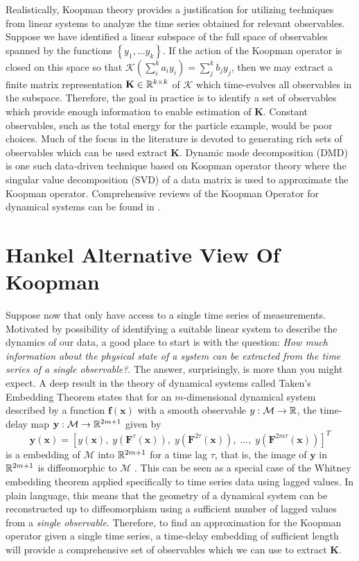 Realistically, Koopman theory provides a justification for utilizing techniques
from linear systems to analyze the time series obtained for relevant
observables. Suppose we have identified a linear subspace of the full space of
observables spanned by the functions $\left\{ y_1, ... y_k  \right\}$. If the
action of the Koopman operator is closed on this space so that
$\mathcal{K}(\sum_i^k a_i y_i) = \sum_j^k b_jy_j$, then we may extract a finite
matrix representation $\mathbf{K} \in \mathbb{R}^{k \times k}$ of $\mathcal{K}$ which
time-evolves all observables in the subspace. Therefore, the goal in practice is
to identify a set of observables which provide enough information to enable
estimation of $\mathbf{K}$. Constant observables, such as the total energy for
the particle example, would be poor choices. Much of the focus in the literature is
devoted to generating rich sets of observables which can be used extract
$\mathbf{K}$. Dynamic mode decomposition (DMD) is one such data-driven technique
based on Koopman operator theory where the singular value decomposition (SVD) of
a data matrix is used to approximate the Koopman operator. Comprehensive reviews
of the Koopman Operator for dynamical systems can be found in
\cite{brunton-koopman-theory, mezic-koopman-overview}.

\section{Hankel Alternative View Of Koopman}

Suppose now that only have access to a single time series of measurements.
Motivated by possibility of identifying a suitable linear system to describe the
dynamics of our data, a good place to start is with the question: \textit{How
  much information about the physical state of a system can be extracted from
  the time series of a single observable?}. The answer, surprisingly, is more
than you might expect. A deep result in the theory of dynamical systems called
Taken's Embedding Theorem states that for an $m$-dimensional dynamical system
described by a function $\mathbf{f}(\mathbf{x})$ with a smooth observable
$y:\mathcal{M}\to\mathbb{R}$, the time-delay map $\mathbf{y}:\mathcal{M}\to\mathbb{R}^{2m+1}$
given by
\begin{equation}
  \mathbf{y}(\mathbf{x}) = [y(\mathbf{x}),\; y(\mathbf{F}^{\tau}(\mathbf{x})),\; y(\mathbf{F}^{2\tau}(\mathbf{x})),\; ...,\; y(\mathbf{F}^{2m\tau}(\mathbf{x}))]^T
\end{equation}
is a embedding of $\mathcal{M}$ into $\mathbb{R}^{2m+1}$ for a time lag $\tau$, that is,
the image of $\mathbf{y}$ in $\mathbb{R}^{2m + 1}$ is diffeomorphic to $\mathcal{M}$
\cite{takens-embedding-theorem}. This can be seen as a special case of the
Whitney embedding theorem applied specifically to time series data using lagged
values. In plain language, this means that the geometry of a dynamical system
can be reconstructed up to diffeomorphism using a sufficient number of lagged
values from a \textit{single observable}. Therefore, to find an approximation
for the Koopman operator given a single time series, a time-delay embedding of
sufficient length will provide a comprehensive set of observables which we can
use to extract $\mathbf{K}$.

